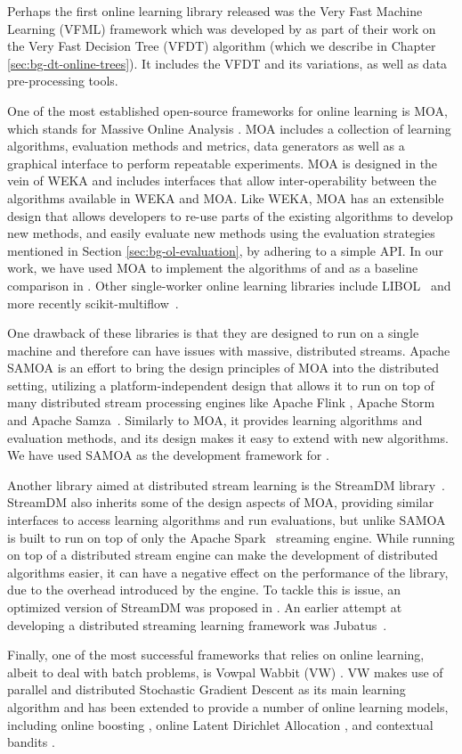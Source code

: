 Perhaps the first online learning library released was the Very Fast Machine Learning (VFML) framework which was developed by \citet{vfdt} as part of their work on the Very Fast Decision Tree (VFDT) algorithm (which we describe in Chapter \ref{sec:bg-dt-online-trees}).
It includes the VFDT and its variations, as well as data pre-processing tools.

One of the most established open-source frameworks for online learning is MOA, which stands
for Massive Online Analysis \cite{bifet2010moa}. MOA includes a collection of
learning algorithms, evaluation methods and metrics, data generators as well as
a graphical interface to perform repeatable experiments. MOA is designed in the
vein of WEKA \cite{weka} and includes interfaces that allow inter-operability
between the algorithms available in WEKA and MOA. Like WEKA, MOA has an extensible
design that allows developers to re-use parts of the existing algorithms to develop
new methods, and easily evaluate new methods using the evaluation strategies mentioned
in Section \ref{sec:bg-ol-evaluation}, by adhering to a simple API. In our work,
we have used MOA to implement the algorithms of \uncertaintrees and as a baseline comparison
in \boostvht. Other single-worker online learning libraries
include LIBOL~\cite{libol} and more recently scikit-multiflow~\cite{sk-multiflow}.

One drawback of these libraries is that they are designed to run on a single machine and therefore
can have issues with massive, distributed streams. Apache SAMOA \cite{samoa} is an effort
to bring the design principles of MOA into the distributed setting, utilizing a platform-independent
design that allows it to run on top of many distributed stream processing engines like
Apache Flink \cite{flink}, Apache Storm~\cite{storm} and Apache Samza~\cite{samza}.
Similarly to MOA, it provides learning algorithms and evaluation methods, and its
design makes it easy to extend with new algorithms.
We have used SAMOA as the development framework for \boostvht.

Another library aimed at distributed stream learning is the StreamDM library~\cite{streamdm}.
StreamDM also inherits some of the design aspects of MOA, providing similar interfaces
to access learning algorithms and run evaluations, but unlike SAMOA
is built to run on top of only the Apache Spark~\cite{spark} streaming engine.
While running on top of a distributed stream engine can make the development
of distributed algorithms easier, it can have a negative effect on the
performance of the library, due to the overhead introduced by the
engine. To tackle this is issue, an optimized version of StreamDM
was proposed in \cite{streamdmPP}. An earlier attempt at developing
a distributed streaming learning framework was Jubatus~\cite{jubatus}.

Finally, one of the most successful frameworks that relies on online learning,
albeit to deal with batch problems, is Vowpal Wabbit (VW) \cite{vw}. VW makes
use of parallel and distributed Stochastic Gradient Descent \cite{sgd} as its main
learning algorithm and has been extended to provide a number of online learning models,
including online boosting \cite{Beygelzimer2015optimal}, online Latent Dirichlet Allocation
\cite{ldaOnline}, and contextual bandits \cite{onlineBandits}.
